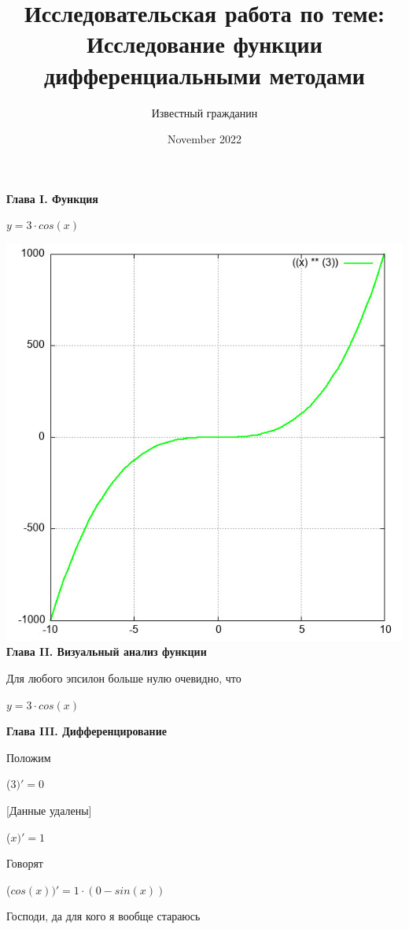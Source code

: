 \documentclass[12pt,a4paper,fleqn]{article}
\title{\textbf{\LARGE{Исследовательская работа по теме:\\Исследование функции дифференциальными методами}}}
\author{Известный гражданин}
\date{November 2022}
\begin{document}
\maketitle
\newpage\newpage \textbf{\LARGE{Глава I. Функция}}

\begin{center}
$y = $$3 \cdot cos(x)$

\end{center}
\includegraphics{GraphicDumps/plot.jpg}\newpage \textbf{\LARGE{Глава II. Визуальный анализ функции}}

Для любого эпсилон больше нулю очевидно, что

\begin{center}
$y = $$3 \cdot cos(x)$

\end{center}
\newpage \textbf{\LARGE{Глава III. Дифференцирование}}

Положим

\begin{center}
 ($3)'
  = 0$\end{center}
[Данные удалены]

\begin{center}
 ($x)'
  = 1$\end{center}
Говорят

\begin{center}
 ($cos(x))'
  = 1 \cdot (0-sin(x))$\end{center}
Господи, да для кого я вообще стараюсь
\end{document}
